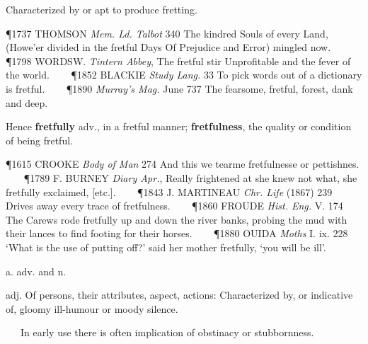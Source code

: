 \begin{description}[wide, labelwidth=!, labelindent=0pt]
\begin{myenumerate}
 Characterized by or apt to produce fretting.

\P 1737 THOMSON  \textit{Mem. Ld. Talbot} 340 The kindred Souls of every Land, (Howe'er divided in the fretful Days Of Prejudice and Error) mingled now.    
\P 1798 WORDSW.  \textit{Tintern Abbey}, The fretful stir Unprofitable and the fever of the world.    
\P 1852 BLACKIE  \textit{Study Lang.} 33 To pick words out of a dictionary is fretful.    
\P 1890 \textit{Murray's  Mag.} June 737 The fearsome, fretful, forest, dank and deep.

Hence \textbf{fretfully} adv., in a fretful manner; \textbf{fretfulness}, the quality or condition of being fretful.

\P 1615 CROOKE  \textit{Body of Man} 274 And this we tearme fretfulnesse or pettishnes.    
\P 1789 F. BURNEY  \textit{Diary Apr.}, Really frightened at she knew not what, she fretfully exclaimed, [etc.].    
\P 1843 J. MARTINEAU  \textit{Chr. Life} (1867) 239 Drives away every trace of fretfulness.    
\P 1860 FROUDE  \textit{Hist. Eng.} V. 174 The Carews rode fretfully up and down the river banks, probing the mud with their lances to find footing for their horses.    
\P 1880 OUIDA  \textit{Moths} I. ix. 228 ‘What is the use of putting off?’ said her mother fretfully, ‘you will be ill’.
\end{myenumerate}


 a. adv. and n.

\noindent {}

\vspace{-0.3cm}

\begin{myenumerate}

 adj.
 Of persons, their attributes, aspect, actions: Characterized by, or indicative of, gloomy ill-humour or moody silence.

   In early use there is often implication of obstinacy or stubbornness.


\end{myenumerate}
\end{description}
